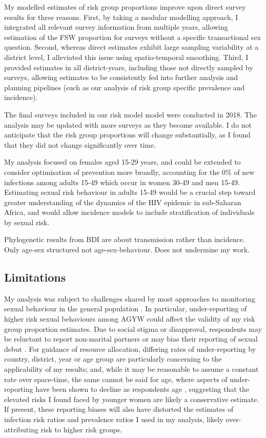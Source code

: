 \documentclass[a4paper, nobind]{templates/ociamthesis}
\begin{document}
My modelled estimates of risk group proportions improve upon direct survey results for three reasons.
First, by taking a modular modelling approach, I integrated all relevant survey information from multiple years, allowing estimation of the FSW proportion for surveys without a specific transactional sex question.
Second, whereas direct estimates exhibit large sampling variability at a district level, I alleviated this issue using spatio-temporal smoothing.
Third, I provided estimates in all district-years, including those not directly sampled by surveys, allowing estimates to be consistently fed into further analysis and planning pipelines (such as our analysis of risk group specific prevalence and incidence).

The final surveys included in our risk model model were conducted in 2018.
The analysis may be updated with more surveys as they become available.
I do not anticipate that the risk group proportions will change substantially, as I found that they did not change significantly over time.

My analysis focused on females aged 15-29 years, and could be extended to consider optimisation of prevention more broadly, accounting for the 0\% of new infections among adults 15-49 which occur in women 30-49 and men 15-49.
Estimating sexual risk behaviour in adults 15-49 would be a crucial step toward greater understanding of the dynamics of the HIV epidemic in sub-Saharan Africa, and would allow incidence models to include stratification of individuals by sexual risk.

Phylogenetic results from BDI are about transmission rather than incidence.
Only age-sex structured not age-sex-behaviour.
Does not undermine my work.

\hypertarget{limitations-1}{%
\subsection{Limitations}\label{limitations-1}}

My analysis was subject to challenges shared by most approaches to monitoring sexual behaviour in the general population \autocite{cleland2004monitoring}.
In particular, under-reporting of higher risk sexual behaviours among AGYW could affect the validity of my risk group proportion estimates.
Due to social stigma or disapproval, respondents may be reluctant to report non-marital partners \autocite[\textcite{helleringer2011reliability}]{nnko2004secretive} or may bias their reporting of sexual debut \autocite{zaba2004age,wringe2009comparative,nguyen2022trends}.
For guidance of resource allocation, differing rates of under-reporting by country, district, year or age group are particularly concerning to the applicability of my results; and, while it may be reasonable to assume a constant rate over space-time, the same cannot be said for age, where aspects of under-reporting have been shown to decline as respondents age \autocite{glynn2011assessing}, suggesting that the elevated risks I found faced by younger women are likely a conservative estimate.
If present, these reporting biases will also have distorted the estimates of infection risk ratios and prevalence ratios I used in my analysis, likely over-attributing risk to higher risk groups.
\end{document}
